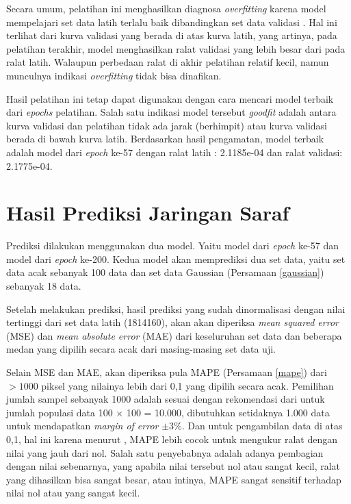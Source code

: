 Secara umum, pelatihan ini menghasilkan diagnosa \textit{overfitting} karena model mempelajari set data latih terlalu baik dibandingkan set data validasi \citep{brownlee_2019a}. Hal ini terlihat dari kurva validasi yang berada di atas kurva latih, yang artinya, pada pelatihan terakhir, model menghasilkan ralat validasi yang lebih besar dari pada ralat latih. Walaupun perbedaan ralat di akhir pelatihan relatif kecil, namun munculnya indikasi \textit{overfitting} tidak bisa dinafikan.

Hasil pelatihan ini tetap dapat digunakan dengan cara mencari model terbaik dari \textit{epochs} pelatihan. Salah satu indikasi model tersebut \textit{goodfit} adalah antara kurva validasi dan pelatihan tidak ada jarak (berhimpit) atau kurva validasi berada di bawah kurva latih. Berdasarkan hasil pengamatan, model terbaik adalah model dari \textit{epoch} ke-57 dengan ralat latih : 2.1185e-04 dan ralat validasi: 2.1775e-04.

\section{Hasil Prediksi Jaringan Saraf}
Prediksi dilakukan menggunakan dua model. Yaitu model dari \textit{epoch} ke-57 dan model dari \textit{epoch} ke-200. Kedua model akan memprediksi dua set data, yaitu set data acak sebanyak 100 data dan set data Gaussian (Persamaan \eqref{gaussian}) sebanyak 18 data.

Setelah melakukan prediksi, hasil prediksi yang sudah dinormalisasi dengan nilai tertinggi dari set data latih (1814160), akan akan diperiksa \textit{mean squared error} (MSE) dan \textit{mean absolute error} (MAE) dari keseluruhan set data dan beberapa medan yang dipilih secara acak dari masing-masing set data uji.

Selain MSE dan MAE, akan diperiksa pula MAPE (Persamaan \eqref{mape}) dari $>1000$ piksel yang nilainya lebih dari 0,1 yang dipilih secara acak. Pemilihan jumlah sampel sebanyak 1000 adalah sesuai dengan rekomendasi dari \cite{israel1992determining} untuk jumlah populasi data 100 $\times$ 100 = 10.000, dibutuhkan setidaknya 1.000 data untuk mendapatkan \textit{margin of error} $\pm 3\%$. Dan untuk pengambilan data di atas 0,1, hal ini karena menurut \cite{DEMYTTENAERE201638}, MAPE lebih cocok untuk mengukur ralat dengan nilai yang jauh dari nol. Salah satu penyebabnya adalah adanya pembagian dengan nilai sebenarnya, yang apabila nilai tersebut nol atau sangat kecil, ralat yang dihasilkan bisa sangat besar, atau intinya, MAPE sangat sensitif terhadap nilai nol atau yang sangat kecil.

